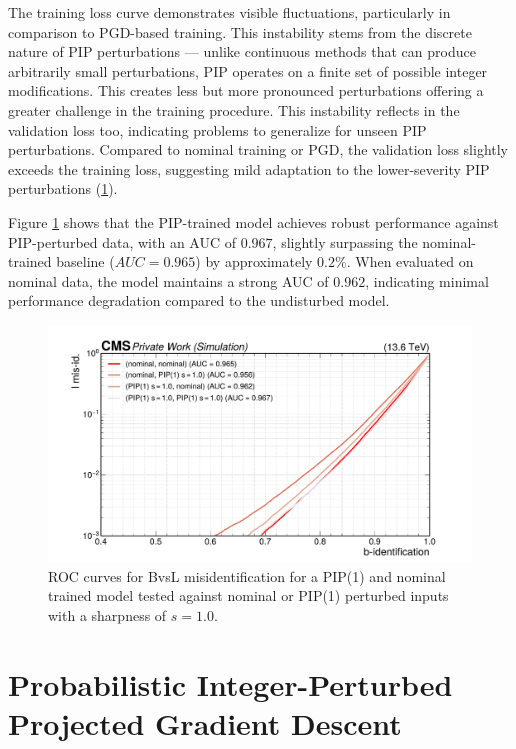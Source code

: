 The training loss curve demonstrates visible fluctuations, particularly in comparison to PGD-based training. This instability stems from the discrete nature of PIP perturbations — unlike continuous methods that can produce arbitrarily small perturbations, PIP operates on a finite set of possible integer modifications. This creates less but more pronounced perturbations offering a greater challenge in the training procedure. This instability reflects in the validation loss too, indicating problems to generalize for unseen PIP perturbations. Compared to nominal training or PGD, the validation loss slightly exceeds the training loss, suggesting mild adaptation to the lower-severity PIP perturbations (\ref{fig:intprob_rocs_training}).

Figure \ref{fig:intprob_rocs_training} shows that the PIP-trained model achieves robust performance against PIP-perturbed data, with an AUC of $0.967$, slightly surpassing the nominal-trained baseline ($AUC = 0.965$) by approximately $0.2\%$. When evaluated on nominal data, the model maintains a strong AUC of $0.962$, indicating minimal performance degradation compared to the undisturbed model.

\begin{figure}[h]
\centering
    \includegraphics[width=15cm]{media/output/roc_bvsl_intprob_permutations.pdf}
    \caption{ROC curves for BvsL misidentification for a PIP(1) and nominal trained model tested against nominal or PIP(1) perturbed inputs with a sharpness of $s=1.0$.}
    \label{fig:intprob_rocs_training}
\end{figure}

\FloatBarrier
\section{Probabilistic Integer-Perturbed Projected Gradient Descent}

